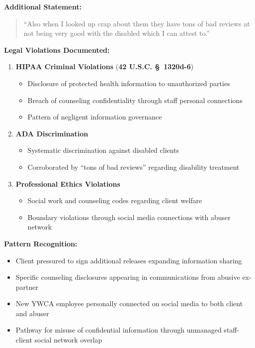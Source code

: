 \documentclass[11pt,letterpaper]{article}
\newcommand{\statref}[1]{\textbf{\color{NavyBlue}#1}}
\newenvironment{testimony}{%
    \begin{quote}\itshape\color{DarkGray}%
}{%
    \end{quote}%
}
\begin{document}
\textbf{Additional Statement:}
\begin{testimony}
``Also when I looked up crap about them they have tons of bad reviews at not being very good with the disabled which I can attest to.''
\end{testimony}

\textbf{Legal Violations Documented:}

\begin{enumerate}[leftmargin=*]
\item \textbf{HIPAA Criminal Violations} (\statref{42 U.S.C. \S~1320d-6})
\begin{itemize}
\item Disclosure of protected health information to unauthorized parties
\item Breach of counseling confidentiality through staff personal connections
\item Pattern of negligent information governance
\end{itemize}

\item \textbf{ADA Discrimination}
\begin{itemize}
\item Systematic discrimination against disabled clients
\item Corroborated by ``tons of bad reviews'' regarding disability treatment
\end{itemize}

\item \textbf{Professional Ethics Violations}
\begin{itemize}
\item Social work and counseling codes regarding client welfare
\item Boundary violations through social media connections with abuser network
\end{itemize}
\end{enumerate}

\textbf{Pattern Recognition:}
\begin{itemize}[leftmargin=*]
\item Client pressured to sign additional releases expanding information sharing
\item Specific counseling disclosures appearing in communications from abusive ex-partner
\item New YWCA employee personally connected on social media to both client and abuser
\item Pathway for misuse of confidential information through unmanaged staff-client social network overlap
\end{itemize}
\end{document}
